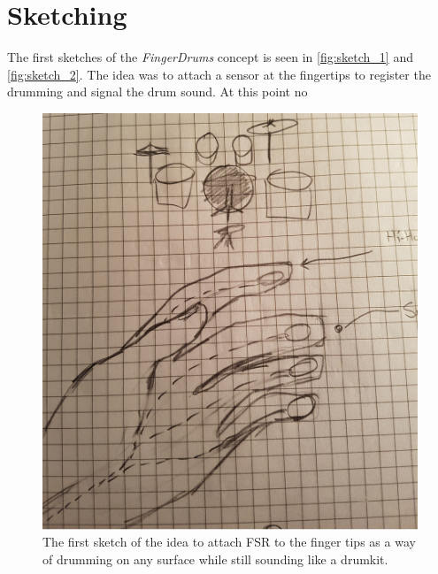 \section{Sketching}
The first sketches of the \textit{FingerDrums} concept is seen in \autoref{fig:sketch_1} and \autoref{fig:sketch_2}. The idea was to attach a sensor at the fingertips to register the drumming and signal the drum sound. At this point no 
\begin{figure}
\centering
\includegraphics[scale=0.10]{Figure/sketch_1.jpg}
\caption{The first sketch of the idea to attach FSR to the finger tips as a way of drumming on any surface while still sounding like a drumkit.}
\label{fig:sketch_1}
\end{figure}



